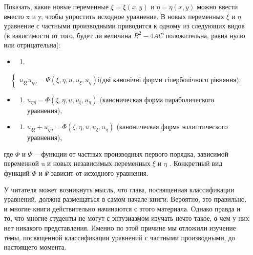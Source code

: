 \documentclass[
  ukrainian,
]{article}
\providecommand{\tightlist}{%
  \setlength{\itemsep}{0pt}\setlength{\parskip}{0pt}}
\begin{document}
Показать, какие новые переменные \(\xi = \xi(x, y)\) и
\(\eta = \eta(x, y)\) можно ввести вместо x и y, чтобы упростить
исходное уравнение. В новых переменных \(\xi\) и \(\eta\) уравнение с
частными производными приводится к одному из следующих видов (в
вависимости от того, будет ли величина \(B^2 - 4AC\) положительна, равна
нулю или отрицательна):

\begin{itemize}
\tightlist
\item
  \begin{enumerate}
  \def\labelenumi{\arabic{enumi}.}
  \tightlist
  \item
  \end{enumerate}
\end{itemize}

\[
\begin{cases} u_{\xi\xi} u_{\eta\eta} = \Psi(\xi,  \eta, u, u_{\xi}, u_{\eta}) і \text{(дві канонічні форми гіперболічного рівняння),} \end{cases}
\]

\begin{itemize}
\tightlist
\item
  \begin{enumerate}
  \def\labelenumi{\arabic{enumi}.}
  \setcounter{enumi}{1}
  \tightlist
  \item
    \(u_{\eta\eta} = \Phi(\xi, \eta, u, u_{\xi}, u_{\eta})\)
    (каноническая форма параболического уравнения),
  \end{enumerate}
\item
  \begin{enumerate}
  \def\labelenumi{\arabic{enumi}.}
  \setcounter{enumi}{2}
  \tightlist
  \item
    \(u_{\xi\xi} + u_{\eta\eta} = \Phi(\xi, \eta, u, u_{\xi}, u_{\eta})\)
    (каноническая форма эллиптического уравнения),
  \end{enumerate}
\end{itemize}

где \(\Phi\) и \(\Psi\) ---функции от частных производных первого
порядка, зависимой переменной u и новых независимых переменных \(\xi\) и
\(\eta\) . Конкретный вид функций \(\Phi\) и \(\Psi\) зависит от
исходного уравнения.

У читателя может возникнуть мысль, что глава, посвященная классификации
уравнений, должна размещаться в самом начале книги. Вероятно, это
правильно, и многие книги действительно начинаются с этого материала.
Однако правда и то, что многие студенты не могут с энтузиазмом изучать
нечто такое, о чем у них нет никакого представления. Именно по этой
причине мы отложили изучение темы, посвященной классификации уравнений с
частными производными, до настоящего момента.
\end{document}
